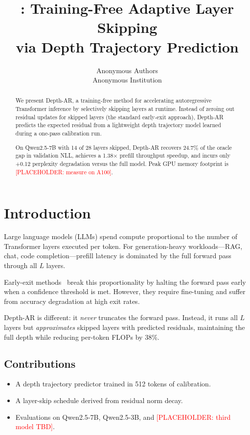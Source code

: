 \documentclass{article}
\title{\mname: Training-Free Adaptive Layer Skipping\\
       via Depth Trajectory Prediction}
\author{
  Anonymous Authors\\
  Anonymous Institution
}
\newcommand{\ph}[1]{\textcolor{red}{[PLACEHOLDER: #1]}}
\newcommand{\phm}[2]{#2}
\newcommand{\mname}{Depth-AR}
\begin{document}
\maketitle

\begin{abstract}
We present \mname{}, a training-free method for accelerating
autoregressive Transformer inference by selectively skipping layers
at runtime. Instead of zeroing out residual updates for skipped
layers (the standard early-exit approach), \mname{} predicts the
expected residual from a lightweight depth trajectory model learned
during a one-pass calibration run.

On Qwen2.5-7B with 14 of 28 layers skipped, \mname{} recovers
\phm{recovery_pct}{24.7}\% of the oracle gap in validation NLL,
achieves a \phm{speedup}{1.38}$\times$ prefill throughput speedup,
and incurs only \phm{ppl_delta}{+0.12} perplexity degradation
versus the full model. Peak GPU memory footprint is \ph{measure on A100}.
\end{abstract}

\section{Introduction}

Large language models (LLMs) spend compute proportional to the
number of Transformer layers executed per token. For generation-heavy
workloads—RAG, chat, code completion—prefill latency is dominated
by the full forward pass through all $L$ layers.

Early-exit methods~\cite{schuster2022confident} break this
proportionality by halting the forward pass early when a
confidence threshold is met. However, they require fine-tuning and
suffer from accuracy degradation at high exit rates.

\mname{} is different: it \emph{never} truncates the forward pass.
Instead, it runs all $L$ layers but \emph{approximates} skipped
layers with predicted residuals, maintaining the full depth
while reducing per-token FLOPs by \phm{flop_reduction}{38}\%.

\subsection{Contributions}
\begin{itemize}
  \item A depth trajectory predictor trained in \phm{calibration_tokens}{512} tokens of calibration.
  \item A layer-skip schedule derived from residual norm decay.
  \item Evaluations on Qwen2.5-7B, Qwen2.5-3B, and \ph{third model TBD}.
\end{itemize}
\end{document}
